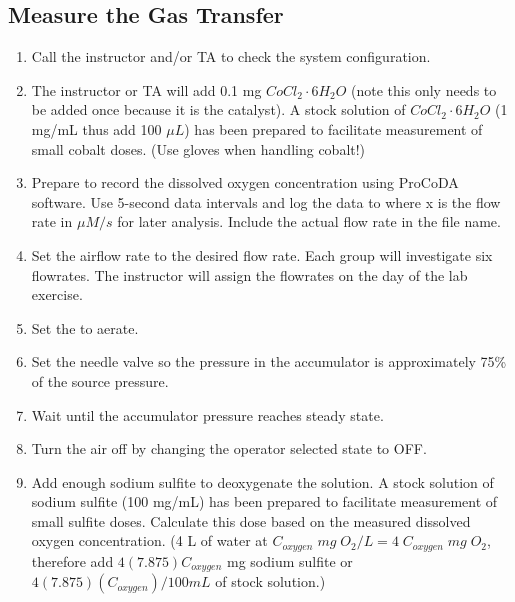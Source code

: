 \documentclass[letterpaper,10pt,english]{sphinxmanual}
\begin{document}
\subsection{Measure the Gas Transfer}
\label{\detokenize{Gas_Transfer/Gas_Transfer:measure-the-gas-transfer}}\begin{enumerate}
\item {} 
Call the instructor and/or TA to check the system configuration.

\item {} 
The instructor or TA will add 0.1 mg \(CoCl_2 \cdot 6H_2O\) (note this only needs to be added once because it is the catalyst). A stock solution of \(CoCl_2 \cdot 6H_2O\) (1 mg/mL \textendash{} thus add 100 \(\mu L\)) has been prepared to facilitate measurement of small cobalt doses. (Use gloves when handling cobalt!)

\item {} 
Prepare to record the dissolved oxygen concentration using ProCoDA software. Use 5-second data intervals and log the data to  where x is the flow rate in \(\mu M/s\) for later analysis. Include the actual flow rate in the file name.

\item {} 
Set the airflow rate to the desired flow rate.  Each group will investigate six flowrates.  The instructor will assign the flowrates on the day of the lab exercise.

\item {} 
Set the  to aerate.

\item {} 
Set the needle valve so the pressure in the accumulator is approximately 75\% of the source pressure.

\item {} 
Wait until the accumulator pressure reaches steady state.

\item {} 
Turn the air off by changing the operator selected state to OFF.

\item {} 
Add enough sodium sulfite to deoxygenate the solution. A stock solution of sodium sulfite (100 mg/mL) has been prepared to facilitate measurement of small sulfite doses. Calculate this dose based on the measured dissolved oxygen concentration. (4 L of water at \(C_{oxygen}\; mg \; O_2/L = 4\; C_{oxygen}\; mg\; O_2\), therefore add \(4 (7.875) C_{oxygen}\) mg sodium sulfite or \(4(7.875)(C_{oxygen})/100 mL\) of stock solution.)


\end{enumerate}
\end{document}
